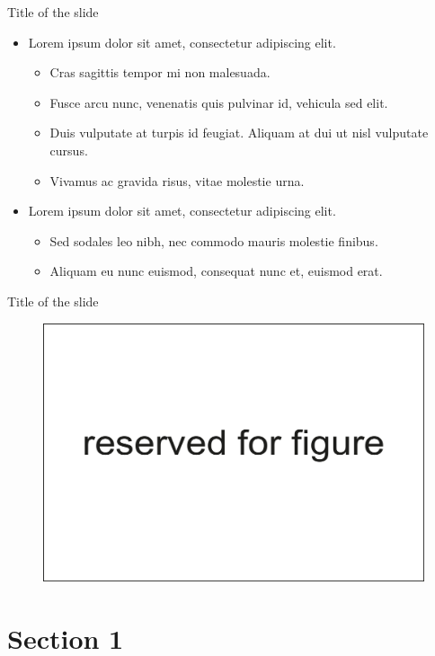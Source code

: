 \documentclass[russian,12pt,aspectratio=169,xcolor=table]{beamer}
\begin{document}
\begin{frame}{Title of the slide}
	\begin{itemize}\itemsep6pt
		\item Lorem ipsum dolor sit amet, consectetur adipiscing elit.
		\begin{itemize}\itemsep6pt
				\item Cras sagittis tempor mi non malesuada.
				\item Fusce arcu nunc, venenatis quis pulvinar id, vehicula sed elit.
				\item Duis vulputate at turpis id feugiat. Aliquam at dui ut nisl vulputate cursus. 
				\item Vivamus ac gravida risus, vitae molestie urna.
		\end{itemize}
		\item Lorem ipsum dolor sit amet, consectetur adipiscing elit.
		\begin{itemize}\itemsep6pt
			\item Sed sodales leo nibh, nec commodo mauris molestie finibus.
			\item Aliquam eu nunc euismod, consequat nunc et, euismod erat. 
			\end{itemize}
	\end{itemize}
\end{frame}

\begin{frame}{Title of the slide}
	\begin{figure}
		\centering
		\includegraphics[scale=0.5]{img/2}
	\end{figure}
\end{frame}

\section{Section 1}
\end{document}
